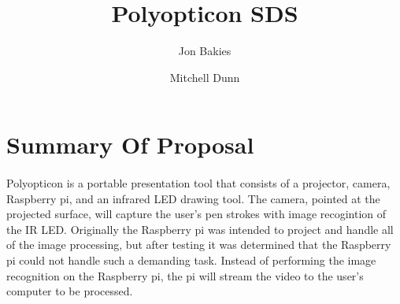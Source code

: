 \documentclass[12pt]{article}
\begin{document}
\title{Polyopticon SDS}
\author{Jon Bakies \and Mitchell Dunn} 

\maketitle
\newpage

\tableofcontents
\newpage

\section{Summary Of Proposal}
\paragraph{}
Polyopticon is a portable presentation tool that consists of a projector, camera, Raspberry pi, and an infrared LED drawing tool.
The camera, pointed at the projected surface, will capture the user's pen strokes with image recogintion of the IR LED.
Originally the Raspberry pi was intended to project and handle all of the image processing, but after testing it was determined that the Raspberry pi could not handle such a demanding task.
Instead of performing the image recognition on the Raspberry pi, the pi will stream the video to the user's computer to be processed.



\end{document}
